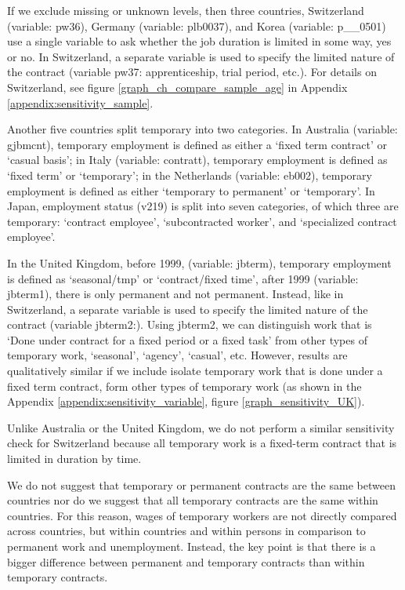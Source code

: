 If we exclude missing or unknown levels, then three countries, Switzerland (variable: pw36), Germany (variable: plb0037), and Korea (variable: p\_\_0501) use a single variable to ask whether the job duration is limited in some way, yes or no.  In Switzerland, a separate variable is used to specify the limited nature of the contract (variable pw37: apprenticeship, trial period, etc.).  For details on Switzerland, see figure \ref{graph_ch_compare_sample_age} in Appendix \ref{appendix:sensitivity_sample}.

Another five countries split temporary into two categories.  In Australia (variable: gjbmcnt), temporary employment is defined as either a `fixed term contract' or `casual basis'; in Italy (variable: contratt), temporary employment is defined as `fixed term' or `temporary'; in the Netherlands (variable: eb002), temporary employment is defined as either `temporary to permanent' or  `temporary'.  In Japan, employment status (v219) is split into seven categories, of which three are temporary: `contract employee', `subcontracted worker', and `specialized contract employee'.  

In the United Kingdom, before 1999, (variable: jbterm), temporary employment is defined as `seasonal/tmp' or  `contract/fixed time', after 1999 (variable: jbterm1), there is only permanent and not permanent.  Instead, like in Switzerland, a separate variable is used to specify the limited nature of the contract (variable jbterm2:).  Using jbterm2, we can distinguish work that is `Done under contract for a fixed period or a fixed task' from other types of temporary work, `seasonal', `agency', `casual', etc.  However, results are qualitatively similar if we include isolate temporary work that is done under a fixed term contract, form other types of temporary work (as shown in the Appendix \ref{appendix:sensitivity_variable}, figure \ref{graph_sensitivity_UK}).  

Unlike Australia or the United Kingdom, we do not perform a similar sensitivity check for Switzerland because all temporary work is a fixed-term contract that is limited in duration by time.

We do not suggest that temporary or permanent contracts are the same between countries nor do we suggest that all temporary contracts are the same within countries.  For this reason, wages of temporary workers are not directly compared across countries, but within countries and within persons in comparison to permanent work and unemployment.  Instead, the key point is that there is a bigger difference between permanent and temporary contracts than within temporary contracts.  

